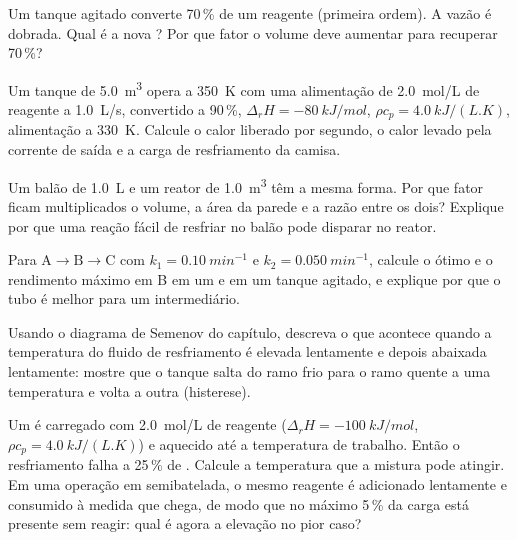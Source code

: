 \begin{exercise}[$\star\star$]\label{exo:b2:continuous-reactors:7}
Um tanque agitado converte 70\,\% de um reagente (primeira ordem). A vazão é
dobrada. Qual é a nova ? Por que fator o volume deve aumentar para
recuperar 70\,\%?
\end{exercise}

\begin{exercise}[$\star\star$]\label{exo:b2:continuous-reactors:8}
Um tanque de \qty{5.0}{m^3} opera a \qty{350}{K} com uma alimentação de
\qty{2.0}{mol/L} de reagente a \qty{1.0}{L/s}, convertido a 90\,\%, $\Delta_r H
= \qty{-80}{kJ/mol}$, $\rho c_p = \qty{4.0}{kJ/(L.K)}$, alimentação a \qty{330}{K}.
Calcule o calor liberado por segundo, o calor levado pela corrente de saída e
a carga de resfriamento da camisa.
\end{exercise}

\begin{exercise}[$\star\star$]\label{exo:b2:continuous-reactors:9}
Um balão de \qty{1.0}{L} e um reator de \qty{1.0}{m^3} têm a mesma forma.
Por que fator ficam multiplicados o volume, a área da parede e a razão entre
os dois? Explique por que uma reação fácil de resfriar no balão pode
disparar no reator.
\end{exercise}

\begin{exercise}[$\star\star\star$]\label{exo:b2:continuous-reactors:10}
Para $\mathrm A \to \mathrm B \to \mathrm C$ com $k_1 = \qty{0.10}{min^{-1}}$
e $k_2 = \qty{0.050}{min^{-1}}$, calcule o  ótimo e o
rendimento máximo em B em um  e em um tanque
agitado, e explique por que o tubo é melhor para um intermediário.
\end{exercise}

\begin{exercise}[$\star\star\star$]\label{exo:b2:continuous-reactors:11}
Usando o diagrama de Semenov do capítulo, descreva o que acontece quando a
temperatura do fluido de resfriamento é elevada lentamente e depois abaixada
lentamente: mostre que o tanque salta do ramo frio para o ramo quente a uma
temperatura e volta a outra (histerese).
\end{exercise}

\begin{exercise}[$\star\star\star$]\label{exo:b2:continuous-reactors:12}
Um  é carregado com \qty{2.0}{mol/L} de reagente ($\Delta_r H =
\qty{-100}{kJ/mol}$, $\rho c_p = \qty{4.0}{kJ/(L.K)}$) e aquecido até a
temperatura de trabalho. Então o resfriamento falha a 25\,\% de .
Calcule a temperatura que a mistura pode atingir. Em uma operação em
semibatelada, o mesmo reagente é adicionado lentamente e consumido à medida
que chega, de modo que no máximo 5\,\% da carga está presente sem reagir:
qual é agora a elevação no pior caso?
\end{exercise}


